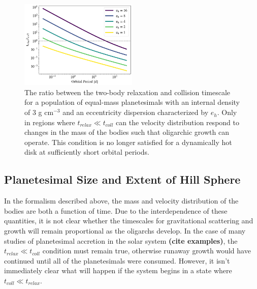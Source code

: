 \documentclass[twocolumn]{aastex63}
\begin{document}
\begin{figure}
\begin{center}
    \includegraphics[width=0.5\textwidth]{figures/timescales.png}
    \caption{The ratio between the two-body relaxation and collision
      timescale for a population of equal-mass planetesimals with an
      internal density of 3 g cm$^{-3}$ and an eccentricity dispersion
      characterized by $e_h$. Only in regions where $t_{relax} \ll t_{coll}$ can 
      the velocity distribution respond to changes in the mass of the bodies such
      that oligarchic growth can operate. This condition is no longer satisfied for a dynamically hot disk at sufficiently short orbital periods.\label{fig:timescales}}
\end{center}
\end{figure}

\subsection{Planetesimal Size and Extent of Hill Sphere}\label{sec:sizeandhill}

In the formalism described above, the mass and velocity distribution
of the bodies are both a function of time. Due to the interdependence
of these quantities, it is not clear whether the timescales for
gravitational scattering and growth will remain proportional as the
oligarchs develop. In the case of many studies of planetesimal
accretion in the solar system
{\bf(cite examples)}, the $t_{relax} \ll t_{coll}$ condition must remain true, otherwise runaway growth would have continued until all of the planetesimals were consumed. However, it isn't immediately clear what will happen if the system begins in a state where $t_{coll} \ll t_{relax}$.
\end{document}
